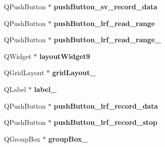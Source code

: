 \begin{DoxyCompactItemize}
\item 
\hypertarget{class_ui___main_window_a95524248505587a7437e8428cd7d807a}{}Q\+Push\+Button $\ast$ {\bfseries push\+Button\+\_\+sv\+\_\+record\+\_\+data}\label{class_ui___main_window_a95524248505587a7437e8428cd7d807a}

\item 
\hypertarget{class_ui___main_window_a3d489698de6864b27fdecfbc7c4e266e}{}Q\+Push\+Button $\ast$ {\bfseries push\+Button\+\_\+lrf\+\_\+read\+\_\+range}\label{class_ui___main_window_a3d489698de6864b27fdecfbc7c4e266e}

\item 
\hypertarget{class_ui___main_window_ae8965af479ad55109b7d84c2010f7b24}{}Q\+Push\+Button $\ast$ {\bfseries push\+Button\+\_\+lrf\+\_\+read\+\_\+range\+\_}\label{class_ui___main_window_ae8965af479ad55109b7d84c2010f7b24}

\item 
\hypertarget{class_ui___main_window_a46366f6ce04245d968218717ff8b91ab}{}Q\+Widget $\ast$ {\bfseries layout\+Widget9}\label{class_ui___main_window_a46366f6ce04245d968218717ff8b91ab}

\item 
\hypertarget{class_ui___main_window_a0bdc0d6ee9d3d95f58c53d84871f82b9}{}Q\+Grid\+Layout $\ast$ {\bfseries grid\+Layout\+\_}\label{class_ui___main_window_a0bdc0d6ee9d3d95f58c53d84871f82b9}

\item 
\hypertarget{class_ui___main_window_a55100f53189f25cf8a1ee0beb29be642}{}Q\+Label $\ast$ {\bfseries label\+\_}\label{class_ui___main_window_a55100f53189f25cf8a1ee0beb29be642}

\item 
\hypertarget{class_ui___main_window_a2319c1b7290c1b0736f43d613646a51e}{}Q\+Push\+Button $\ast$ {\bfseries push\+Button\+\_\+lrf\+\_\+record\+\_\+data}\label{class_ui___main_window_a2319c1b7290c1b0736f43d613646a51e}

\item 
\hypertarget{class_ui___main_window_ac59a31d0746689ef20d1d3891f162488}{}Q\+Push\+Button $\ast$ {\bfseries push\+Button\+\_\+lrf\+\_\+record\+\_\+stop}\label{class_ui___main_window_ac59a31d0746689ef20d1d3891f162488}

\item 
\hypertarget{class_ui___main_window_abb28acde35ffce4d0e6152579df2cbc3}{}Q\+Group\+Box $\ast$ {\bfseries group\+Box\+\_}\label{class_ui___main_window_abb28acde35ffce4d0e6152579df2cbc3}


\end{DoxyCompactItemize}
